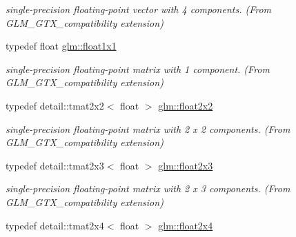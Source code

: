 \begin{DoxyCompactItemize}
\begin{DoxyCompactList}\small\item\em single-\/precision floating-\/point vector with 4 components. (From G\+L\+M\+\_\+\+G\+T\+X\+\_\+compatibility extension) \end{DoxyCompactList}\item 
\hypertarget{group__gtx__compatibility_gaac1faa940ac1fbb32d4a315005b578af}{}typedef float \hyperlink{group__gtx__compatibility_gaac1faa940ac1fbb32d4a315005b578af}{glm\+::float1x1}\label{group__gtx__compatibility_gaac1faa940ac1fbb32d4a315005b578af}

\begin{DoxyCompactList}\small\item\em single-\/precision floating-\/point matrix with 1 component. (From G\+L\+M\+\_\+\+G\+T\+X\+\_\+compatibility extension) \end{DoxyCompactList}\item 
\hypertarget{group__gtx__compatibility_gaab96854e7808550bb4aa1574faeda520}{}typedef detail\+::tmat2x2$<$ float $>$ \hyperlink{group__gtx__compatibility_gaab96854e7808550bb4aa1574faeda520}{glm\+::float2x2}\label{group__gtx__compatibility_gaab96854e7808550bb4aa1574faeda520}

\begin{DoxyCompactList}\small\item\em single-\/precision floating-\/point matrix with 2 x 2 components. (From G\+L\+M\+\_\+\+G\+T\+X\+\_\+compatibility extension) \end{DoxyCompactList}\item 
\hypertarget{group__gtx__compatibility_gab5ecce47918283856360180d5bc1c18f}{}typedef detail\+::tmat2x3$<$ float $>$ \hyperlink{group__gtx__compatibility_gab5ecce47918283856360180d5bc1c18f}{glm\+::float2x3}\label{group__gtx__compatibility_gab5ecce47918283856360180d5bc1c18f}

\begin{DoxyCompactList}\small\item\em single-\/precision floating-\/point matrix with 2 x 3 components. (From G\+L\+M\+\_\+\+G\+T\+X\+\_\+compatibility extension) \end{DoxyCompactList}\item 
\hypertarget{group__gtx__compatibility_ga99175f1fa90053b7d7414cfc8b9153c9}{}typedef detail\+::tmat2x4$<$ float $>$ \hyperlink{group__gtx__compatibility_ga99175f1fa90053b7d7414cfc8b9153c9}{glm\+::float2x4}\label{group__gtx__compatibility_ga99175f1fa90053b7d7414cfc8b9153c9}


\end{DoxyCompactItemize}
